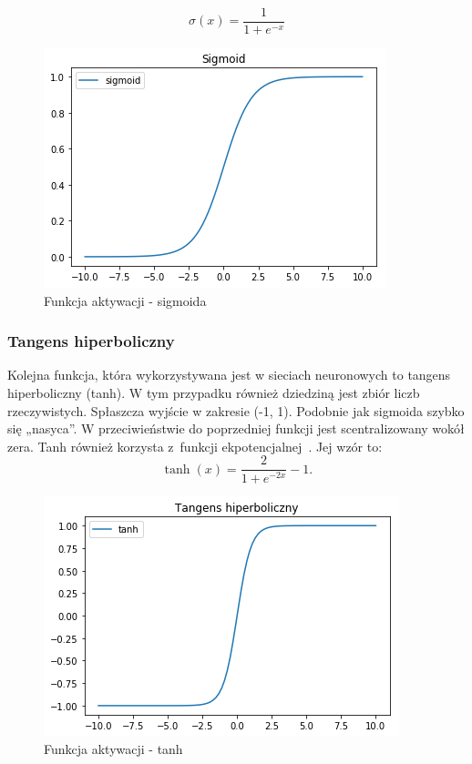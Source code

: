     \begin{equation}
        \sigma(x) = \frac {1}{1+e^{-x}}
    \end{equation}

    \begin{figure}[htp]
        \centering
        \includegraphics[scale=0.8]{./img/sigmoid.png}
        \caption{Funkcja aktywacji - sigmoida}
    \end{figure}

    \subsubsection{Tangens hiperboliczny}
    Kolejna funkcja, która wykorzystywana jest w sieciach neuronowych to tangens hiperboliczny (tanh).
    W tym przypadku również dziedziną jest zbiór liczb rzeczywistych.
    Spłaszcza wyjście w zakresie (-1, 1).
    Podobnie jak sigmoida szybko się „nasyca”.
    W przeciwieństwie do poprzedniej funkcji jest scentralizowany wokół zera.
    Tanh również korzysta z~funkcji ekpotencjalnej~\cite{cs231_neural_2}.
    Jej wzór to:
    \begin{equation}
        \tanh(x) = \frac {2}{1+e^{-2x}} - 1.
    \end{equation}

    \begin{figure}[htp]
        \centering
        \includegraphics[scale=0.8]{./img/tanh.png}
        \caption{Funkcja aktywacji - tanh}
    \end{figure}

